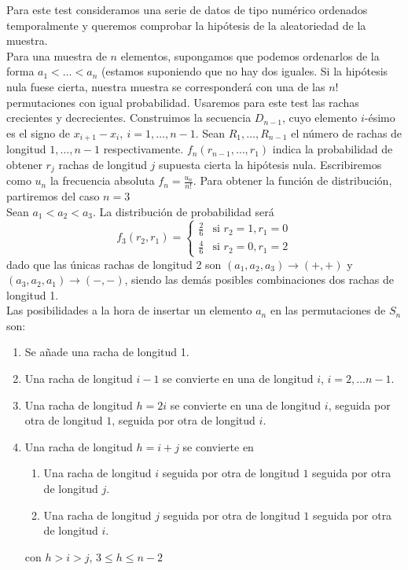 	Para este test consideramos una serie de datos de tipo numérico ordenados temporalmente y queremos comprobar la hipótesis de la aleatoriedad de la muestra.\\
	Para una muestra de $n$ elementos, supongamos que podemos ordenarlos de la forma $a_1 < \dots < a_n$ (estamos suponiendo que no hay dos iguales. Si la hipótesis nula fuese cierta, nuestra muestra se corresponderá con una de las $n!$ permutaciones con igual probabilidad. Usaremos para este test las rachas crecientes y decrecientes. Construimos la secuencia $D_{n-1}$, cuyo elemento $i$-ésimo es el signo de $x_{i+1} - x_i,\ i=1, \dots, n-1$. Sean $R_1, \dots, R_{n-1}$ el número de rachas de longitud $1, \dots, n-1$ respectivamente. $f_n(r_{n-1}, \dots, r_1)$ indica la probabilidad de obtener $r_j$ rachas de longitud $j$ supuesta cierta la hipótesis nula. Escribiremos como $u_n$ la frecuencia absoluta $f_n = \frac{u_n}{n!}$. Para obtener la función de distribución, partiremos del caso $n=3$\\
	Sean $a_1 < a_2 < a_3$. La distribución de probabilidad será 
	\[ 
	f_3(r_2, r_1) = 
		\left\lbrace\begin{array}{cc}
			\frac{2}{6} & \text{si } r_2 = 1, r_1 = 0 \\
			\frac{4}{6} & \text{si } r_2 = 0, r_1 = 2 
		\end{array}\right.
	\]
	dado que las únicas rachas de longitud 2 son $(a_1, a_2, a_3) \rightarrow (+,+)$ y $(a_3, a_2, a_1) \rightarrow (-,-)$, siendo las demás posibles combinaciones dos rachas de longitud 1.\\
	Las posibilidades a la hora de insertar un elemento $a_n$ en las permutaciones de $S_n$ son:
\begin{enumerate}
	\item Se añade una racha de longitud 1.
	\item Una racha de longitud $i-1$ se convierte en una de longitud $i$, $i=2,\dots n-1$.
	\item Una racha de longitud $h=2i$ se convierte en una de longitud $i$, seguida por otra de longitud $1$, seguida por otra de longitud $i$.
	\item Una racha de longitud $h=i+j$ se convierte en
	\begin{enumerate}
		\item Una racha de longitud $i$ seguida por otra de longitud $1$ seguida por otra de longitud $j$.
		\item Una racha de longitud $j$ seguida por otra de longitud $1$ seguida por otra de longitud $i$.
	\end{enumerate}
	con $h>i>j$, $3 \leq h \leq n-2$
\end{enumerate}

